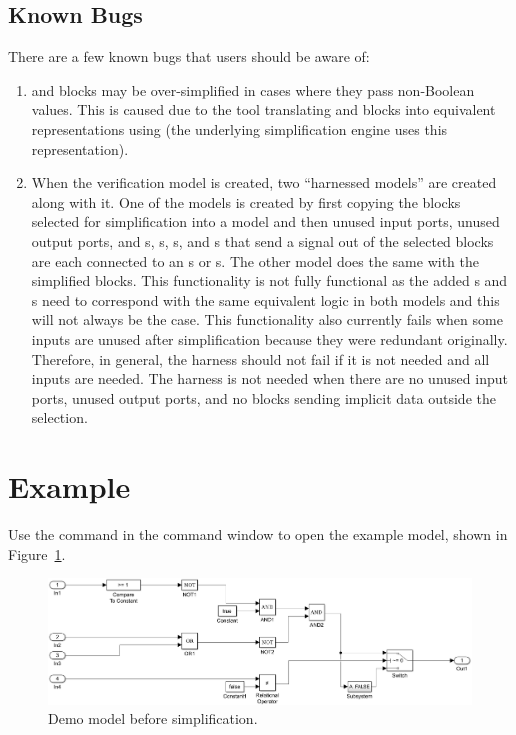\documentclass{article}
\makeatletter
\newcommand{\demoName}{\cmd{SimplifierDemo}\@\xspace}
\makeatother
\begin{document}
\subsection{Known Bugs}
There are a few known bugs that users should be aware of:
\begin{enumerate}
	\item \switch and \ifblk blocks may be over-simplified in cases where they pass non-Boolean values. This is caused due to the tool translating \switch and \ifblk blocks into equivalent representations using \cmd{\&, |, $\sim$, <, <=, >, >=, ==, $\sim$=} (the underlying simplification engine uses this representation).
	
	\item When the verification model is created, two ``harnessed models'' are created along with it.
	One of the models is created by first copying the blocks selected for simplification into a model 
	and then unused input ports, unused output ports, and s, s, s, and s that send a signal out of the selected blocks are each connected to an s or s.
	The other model does the same with the simplified blocks.
	This functionality is not fully functional as the added s and s need to correspond with the same equivalent logic in both models and this will not always be the case.
	This functionality also currently fails when some inputs are unused after simplification because they were redundant originally.
	Therefore, in general, the harness should not fail if it is not needed and all inputs are needed.
	The harness is not needed when there are no unused input ports, unused output ports, and no blocks sending implicit data outside the selection.
\end{enumerate}

\section{Example}
Use the command \demoName in the \Simulink command window to open the example model, shown in Figure~\ref{FIG:demo1}.

\begin{figure}[!htb]
  \centering
	\includegraphics[width=.9\textwidth]{../figs/SimplifierDemo}
	\caption{Demo model before simplification.}
	\label{FIG:demo1}
\end{figure}
\end{document}
